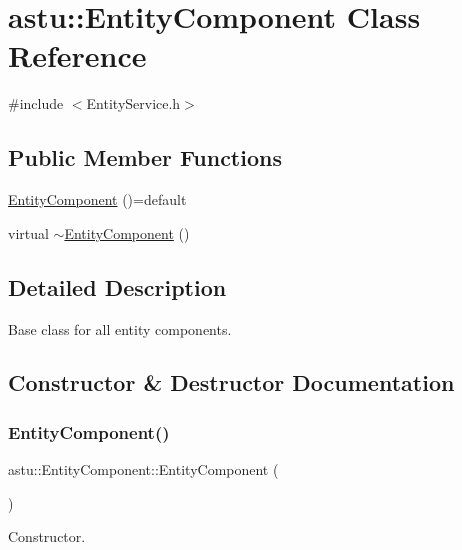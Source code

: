\hypertarget{classastu_1_1EntityComponent}{}\section{astu\+:\+:Entity\+Component Class Reference}
\label{classastu_1_1EntityComponent}


{\ttfamily \#include $<$Entity\+Service.\+h$>$}

\subsection*{Public Member Functions}
\begin{DoxyCompactItemize}
\item 
\hyperlink{classastu_1_1EntityComponent_a9bb95d7ddc55093fd86e04d5b6aa98ec}{Entity\+Component} ()=default
\item 
virtual \hyperlink{classastu_1_1EntityComponent_a17295f763e201247c22bc677541646e5}{$\sim$\+Entity\+Component} ()
\end{DoxyCompactItemize}


\subsection{Detailed Description}
Base class for all entity components. 

\subsection{Constructor \& Destructor Documentation}
\mbox{\label{classastu_1_1EntityComponent_a9bb95d7ddc55093fd86e04d5b6aa98ec}} 
\subsubsection{\texorpdfstring{Entity\+Component()}{EntityComponent()}}
{\footnotesize\ttfamily astu\+::\+Entity\+Component\+::\+Entity\+Component (\begin{DoxyParamCaption}{ }\end{DoxyParamCaption})\hspace{0.3cm}{\ttfamily [default]}}

Constructor. \mbox{\label{classastu_1_1EntityComponent_a17295f763e201247c22bc677541646e5}} 
